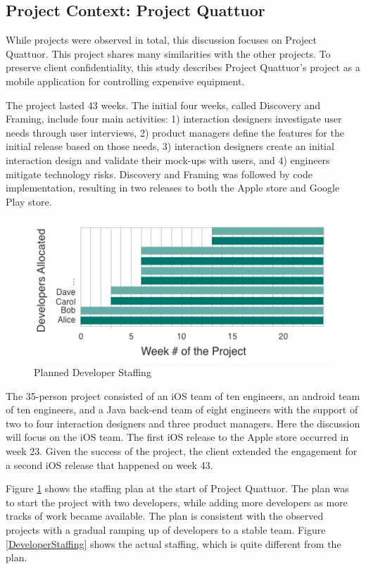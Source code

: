 \subsection{Project Context: Project Quattuor}
\label{ProjectQuattuor}
While \numberOfObservedProjects{} projects were observed in total, this discussion focuses on Project Quattuor. This project shares many similarities with the other projects. To preserve client confidentiality, this study describes Project Quattuor's project as a mobile application for controlling expensive equipment.

The project lasted 43 weeks. The initial four weeks, called Discovery and Framing, include four main activities: 1) interaction designers investigate user needs through user interviews, 2) product managers define the features for the initial release based on those needs, 3) interaction designers create an initial interaction design and validate their mock-ups with users, and 4) engineers mitigate technology risks. Discovery and Framing was followed by code implementation, resulting in two releases to both the Apple store and Google Play store.

\begin{figure}[t]
\centering
\includegraphics[width=\twoColumnWidth{}]{sustainable_software_development_images/OriginalDeveloperStaffingV3.jpg}
\caption{Planned Developer Staffing}
\label{PlannedDeveloperStaffing}
\end{figure}

The 35-person project consisted of an iOS team of ten engineers, an android team of ten engineers, and a Java back-end team of eight engineers with the support of two to four interaction designers and three product managers. Here the discussion will focus on the iOS team. The first iOS release to the Apple store occurred in week 23. Given the success of the project, the client extended the engagement for a second iOS release that happened on week 43. 

Figure \ref{PlannedDeveloperStaffing} shows the staffing plan at the start of Project Quattuor. The plan was to start the project with two developers, while adding more developers as more tracks of work became available. The plan is consistent with the observed projects with a gradual ramping up of developers to a stable team. Figure \ref{DeveloperStaffing} shows the actual staffing, which is quite different from the plan.

